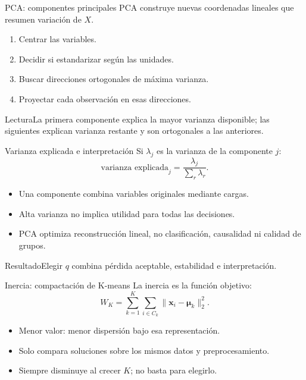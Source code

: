 \documentclass[aspectratio=169,10pt]{beamer}
\begin{document}
\begin{frame}{PCA: componentes principales}
  \small
  PCA construye nuevas coordenadas lineales que resumen variación de $X$.
  \begin{enumerate}
    \item Centrar las variables.
    \item Decidir si estandarizar según las unidades.
    \item Buscar direcciones ortogonales de máxima varianza.
    \item Proyectar cada observación en esas direcciones.
  \end{enumerate}
  \begin{block}{Lectura}La primera componente explica la mayor varianza disponible; las siguientes explican varianza restante y son ortogonales a las anteriores.\end{block}
\end{frame}

\begin{frame}{Varianza explicada e interpretación}
  \small
  Si $\lambda_j$ es la varianza de la componente $j$:
  \[\text{varianza explicada}_j=\frac{\lambda_j}{\sum_r\lambda_r}.\]
  \begin{itemize}
    \item Una componente combina variables originales mediante cargas.
    \item Alta varianza no implica utilidad para todas las decisiones.
    \item PCA optimiza reconstrucción lineal, no clasificación, causalidad ni calidad de grupos.
  \end{itemize}
  \begin{block}{Resultado}Elegir $q$ combina pérdida aceptable, estabilidad e interpretación.\end{block}
\end{frame}

\begin{frame}{Inercia: compactación de K-means}
  \small
  La inercia es la función objetivo:
  \[W_K=\sum_{k=1}^{K}\sum_{i\in C_k}\|\mathbf{x}_i-\boldsymbol{\mu}_k\|_2^2.\]
  \begin{itemize}
    \item Menor valor: menor dispersión bajo esa representación.
    \item Solo compara soluciones sobre los mismos datos y preprocesamiento.
    \item Siempre disminuye al crecer $K$; no basta para elegirlo.
  \end{itemize}
\end{frame}
\end{document}
